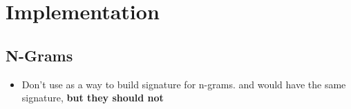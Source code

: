 \chapter{Implementation}

\section{N-Grams}

\begin{itemize}
  \item Don't use  as a way to build signature for n-grams.
   and  would have the same signature,
  \textbf{but they should not}
\end{itemize}
